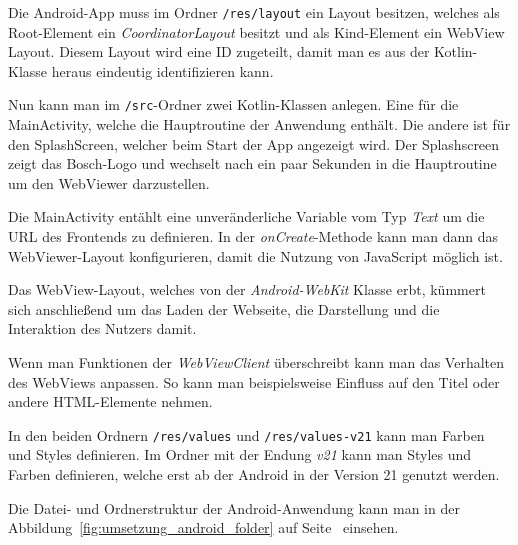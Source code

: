 Die Android-App muss im Ordner \texttt{/res/layout} ein Layout besitzen, welches als Root-Element ein
\textit{CoordinatorLayout} besitzt und als Kind-Element ein WebView Layout. Diesem Layout wird eine ID zugeteilt, damit
man es aus der Kotlin-Klasse heraus eindeutig identifizieren kann.

Nun kann man im \texttt{/src}-Ordner zwei Kotlin-Klassen anlegen. Eine für die MainActivity, welche die Hauptroutine der
Anwendung enthält. Die andere ist für den SplashScreen, welcher beim Start der App angezeigt wird. Der Splashscreen
zeigt das Bosch-Logo und wechselt nach ein paar Sekunden in die Hauptroutine um den WebViewer darzustellen.

Die MainActivity entählt eine unveränderliche Variable vom Typ \textit{Text} um die URL des Frontends zu definieren. In
der \textit{onCreate}-Methode kann man dann das WebViewer-Layout konfigurieren, damit die Nutzung von JavaScript möglich
ist.

Das WebView-Layout, welches von der \textit{Android-WebKit} Klasse erbt, kümmert sich anschließend um das Laden der
Webseite, die Darstellung und die Interaktion des Nutzers damit.

Wenn man Funktionen der \textit{WebViewClient} überschreibt kann man das Verhalten des WebViews anpassen. So kann man
beispielsweise Einfluss auf den Titel oder andere HTML-Elemente nehmen.

In den beiden Ordnern \texttt{/res/values} und \texttt{/res/values-v21} kann man Farben und Styles definieren. Im Ordner
mit der Endung \textit{v21} kann man Styles und Farben definieren, welche erst ab der Android in der Version 21 genutzt
werden.

Die Datei- und Ordnerstruktur der Android-Anwendung kann man in der Abbildung~\ref{fig:umsetzung_android_folder} auf
Seite~\pageref{fig:umsetzung_android_folder} einsehen.

